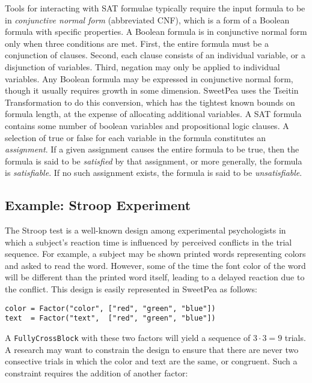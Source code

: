 Tools for interacting with SAT formulae typically require the input formula to be in \textit{conjunctive normal form} (abbreviated CNF), which is a form of a Boolean formula with specific properties. A Boolean formula is in conjunctive normal form only when three conditions are met. First, the entire formula must be a conjunction of clauses. Second, each clause consists of an individual variable, or a disjunction of variables. Third, negation may only be applied to individual variables. Any Boolean formula may be expressed in conjunctive normal form, though it usually requires growth in some dimension. SweetPea uses the Tseitin Transformation \cite{tseitin1983complexity} to do this conversion, which has the tightest known bounds on formula length, at the expense of allocating additional variables. A SAT formula contains some number of boolean variables and propositional logic clauses. A selection of true or false for each variable in the formula constitutes an \textit{assignment}. If a given assignment causes the entire formula to be true, then the formula is said to be \textit{satisfied} by that assignment, or more generally, the formula is \textit{satisfiable}. If no such assignment exists, the formula is said to be \textit{unsatisfiable}.

\subsection{Example: Stroop Experiment}

The Stroop test \cite{stroop1935studies} is a well-known design among experimental psychologists in which a subject's reaction time is influenced by perceived conflicts in the trial sequence. For example, a subject may be shown printed words representing colors and asked to read the word. However, some of the time the font color of the word will be different than the printed word itself, leading to a delayed reaction due to the conflict. This design is easily represented in SweetPea as follows:

\begin{verbatim}
color = Factor("color", ["red", "green", "blue"])
text  = Factor("text",  ["red", "green", "blue"])
\end{verbatim}

A \texttt{FullyCrossBlock} with these two factors will yield a sequence of $3 \cdot 3 = 9$ trials. A research may want to constrain the design to ensure that there are never two consective trials in which the color and text are the same, or congruent. Such a constraint requires the addition of another factor:

